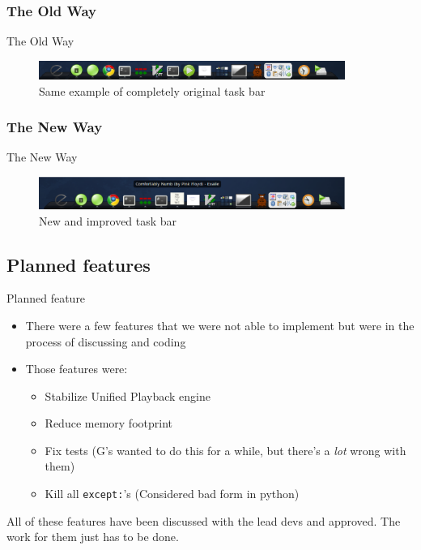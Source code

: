\documentclass{beamer}
\begin{document}
\subsubsection{The Old Way}
\begin{frame}{The Old Way}
  \begin{figure}
    \centering
    \includegraphics[width=100mm]{images/awn}
    \caption{Same example of completely original task bar}
  \end{figure}
\end{frame}

\subsubsection{The New Way}
\begin{frame}{The New Way}
  \begin{figure}
    \centering
    \includegraphics[width=100mm]{images/awn-new}
    \caption{New and improved task bar}
  \end{figure}
\end{frame}

\subsection{Planned features}
\begin{frame}{Planned feature}
  \begin{itemize}
    \item There were a few features that we were not able to implement but
      were in the process of discussing and coding
    \item Those features were:
    \begin{itemize}
      \item Stabilize Unified Playback engine
      \item Reduce memory footprint
      \item Fix tests (G's wanted to do this for a while, but there's a
        \emph{lot} wrong with them)
      \item Kill all \lstinline!except:!'s (Considered bad form in python)
    \end{itemize}
  \end{itemize}
  All of these features have been discussed with the lead devs and approved.
  The work for them just has to be done.
\end{frame}
\end{document}
